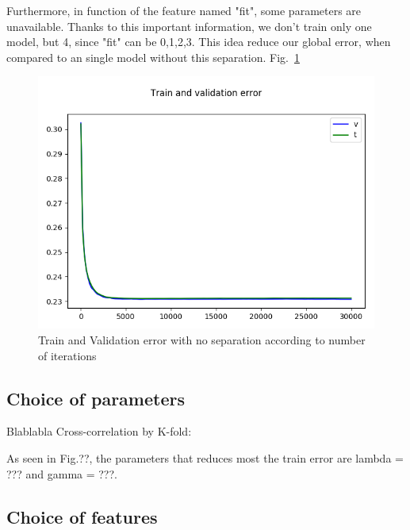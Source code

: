 \documentclass[10pt,conference,compsocconf]{IEEEtran}
\begin{document}
Furthermore, in function of the feature named "fit", some parameters are unavailable. Thanks to this important information, we don't train only one model, but 4, since "fit" can be {0,1,2,3}.
This idea reduce our global error, when compared to an single model without this separation. Fig.~\ref{fig:noSepFunction}

\begin{figure}[tbp]
  \centering
  \includegraphics[width=\columnwidth]{valid_train_error_with_thresh_no_jet.png}
  \caption{Train and Validation error with no separation according to number of iterations}
  \vspace{-3mm}
  \label{fig:noSepFunction}
\end{figure}

\subsection{Choice of parameters}
Blablabla
Cross-correlation by K-fold:

As seen in Fig.??, the parameters that reduces most the train error are lambda = ??? and gamma = ???.

\subsection{Choice of features}
\end{document}
